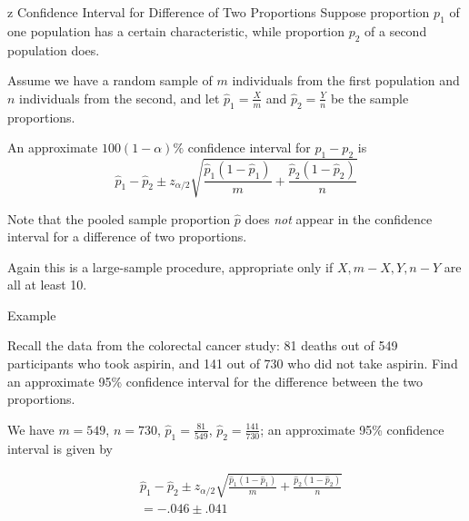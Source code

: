 \documentclass[handout]{beamer}
\begin{document}
\begin{frame}{z Confidence Interval for Difference of Two Proportions}
Suppose proportion $p_1$ of one population has a certain characteristic, while proportion $p_2$ of a second population does. 

\pause\vspace{.2cm}
Assume we have a random sample of $m$ individuals from the first population and $n$ individuals from the second, and let $\hat p_1=\frac X m$ and $\hat p_2=\frac Y n$ be the sample proportions.

\pause\begin{block}{}
An approximate $100(1-\alpha)\%$ confidence interval for $p_1-p_2$ is
$$\hat p_1-\hat p_2 \pm z_{\alpha/2}\sqrt{\frac{\hat p_1(1-\hat p_1)}m+\frac{\hat p_2(1-\hat p_2)}n}$$
\end{block}

\pause Note that the pooled sample proportion $\hat p$ does \textit{not} appear in the confidence interval for a difference of two proportions.

\pause
\vspace{.2cm}
Again this is a large-sample procedure, appropriate only if $X, m-X, Y, n-Y$ are all at least 10.
\end{frame}

\begin{frame}{Example}
\begin{block}{}
Recall the data from the colorectal cancer study: 81 deaths out of 549 participants who took aspirin, and 141 out of 730 who did not take aspirin. Find an approximate 95\% confidence interval for the difference between the two proportions.
\end{block}

\pause We have $m=549$, $n=730$, $\hat p_1=\frac{81}{549}$, $\hat p_2=\frac{141}{730}$; \pause  an approximate 95\% confidence interval is given by

\begin{align*}
&\hat p_1-\hat p_2 \pm z_{\alpha/2}\sqrt{\frac{\hat p_1(1-\hat p_1)}m+\frac{\hat p_2(1-\hat p_2)}n}\\
&=  -.046 \pm  .041
\end{align*}
\end{frame}


\end{document}
